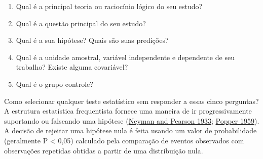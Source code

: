 \documentclass[
]{article}
\providecommand{\tightlist}{%
  \setlength{\itemsep}{0pt}\setlength{\parskip}{0pt}}
\begin{document}
\begin{enumerate}
\def\labelenumi{\arabic{enumi}.}
\tightlist
\item
  Qual é a principal teoria ou raciocínio lógico do seu estudo?
\item
  Qual é a questão principal do seu estudo?
\item
  Qual é a sua hipótese? Quais são suas predições?
\item
  Qual é a unidade amostral, variável independente e dependente de seu trabalho? Existe alguma covariável?
\item
  Qual é o grupo controle?
\end{enumerate}

Como selecionar qualquer teste estatístico sem responder a essas cinco perguntas? A estrutura estatística frequentista fornece uma maneira de ir progressivamente suportando ou falseando uma hipótese (\protect\hyperlink{ref-neyman__problem_1933}{Neyman and Pearson 1933}; \protect\hyperlink{ref-popper_logic_1959}{Popper 1959}). A decisão de rejeitar uma hipótese nula é feita usando um valor de probabilidade (geralmente P \textless{} 0,05) calculado pela comparação de eventos observados com observações repetidas obtidas a partir de uma distribuição nula.
\end{document}
